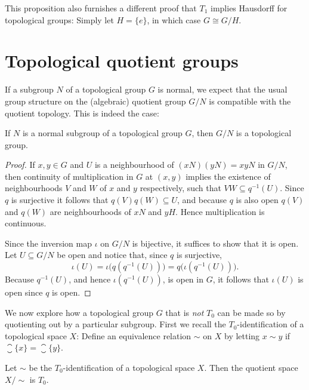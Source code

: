 \documentclass[article, a4paper, 11pt, oneside]{memoir}
\numberwithin{equation}{chapter}
\newcommand{\preim}{^{-1}}
\begin{document}
This proposition also furnishes a different proof that $T_1$ implies Hausdorff for topological groups: Simply let $H = \{e\}$, in which case $G \cong G/H$.


\section{Topological quotient groups}

If a subgroup $N$ of a topological group $G$ is normal, we expect that the usual group structure on the (algebraic) quotient group $G/N$ is compatible with the quotient topology. This is indeed the case:

\begin{theorem}
    If $N$ is a normal subgroup of a topological group $G$, then $G/N$ is a topological group.
\end{theorem}

\begin{proof}
    If $x,y \in G$ and $U$ is a neighbourhood of $(xN)(yN) = xyN$ in $G/N$, then continuity of multiplication in $G$ at $(x,y)$ implies the existence of neighbourhoods $V$ and $W$ of $x$ and $y$ respectively, such that $VW \subseteq q\preim(U)$. Since $q$ is surjective it follows that $q(V) q(W) \subseteq U$, and because $q$ is also open $q(V)$ and $q(W)$ are neighbourhoods of $xN$ and $yH$. Hence multiplication is continuous.

    Since the inversion map $\iota$ on $G/N$ is bijective, it suffices to show that it is open. Let $U \subseteq G/N$ be open and notice that, since $q$ is surjective,
    \begin{equation*}
        \iota(U)
            = \iota \bigl( q(q\preim(U)) \bigr)
            = q \bigl( \iota(q\preim(U)) \bigr).
    \end{equation*}
    Because $q\preim(U)$, and hence $\iota(q\preim(U))$, is open in $G$, it follows that $\iota(U)$ is open since $q$ is open.
\end{proof}

We now explore how a topological group $G$ that is \emph{not} $T_0$ can be made so by quotienting out by a particular subgroup. First we recall the $T_0$-identification of a topological space $X$: Define an equivalence relation $\sim$ on $X$ by letting $x \sim y$ if $\closure{\{x\}} = \closure{\{y\}}$.

\begin{lemma}[$T_0$-identification]
    Let $\sim$ be the $T_0$-identification of a topological space $X$. Then the quotient space $X/{\sim}$ is $T_0$.
\end{lemma}
\end{document}
